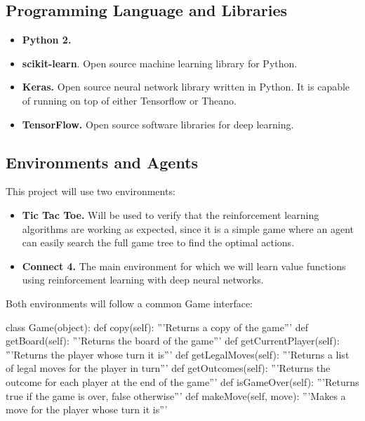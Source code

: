 \documentclass{article}
\begin{document}
\subsection{Programming Language and Libraries}

\begin{itemize}

    \item \textbf{Python 2.}

    \item \textbf{scikit-learn}. Open source machine learning library for Python.

    \item \textbf{Keras.} Open source neural network library written in Python. It is capable of
        running on top of either Tensorflow or Theano.

    \item \textbf{TensorFlow.} Open source software libraries for deep learning.

\end{itemize}

\subsection{Environments and Agents}

This project will use two environments:

\begin{itemize}

    \item \textbf{Tic Tac Toe.} Will be used to verify that the reinforcement learning algorithms
        are working as expected, since it is a simple game where an agent can easily search the full
        game tree to find the optimal actions.

    \item \textbf{Connect 4.} The main environment for which we will learn value functions using
        reinforcement learning with deep neural networks.

\end{itemize}

\noindent Both environments will follow a common \textrm{Game} interface:

\begin{python}
class Game(object):
    def copy(self):
        '''Returns a copy of the game'''
    def getBoard(self):
        '''Returns the board of the game'''
    def getCurrentPlayer(self):
        '''Returns the player whose turn it is'''
    def getLegalMoves(self):
        '''Returns a list of legal moves for the player in turn'''
    def getOutcomes(self):
        '''Returns the outcome for each player at the end of the game'''
    def isGameOver(self):
        '''Returns true if the game is over, false otherwise'''
    def makeMove(self, move):
        '''Makes a move for the player whose turn it is'''
\end{python}
\end{document}
